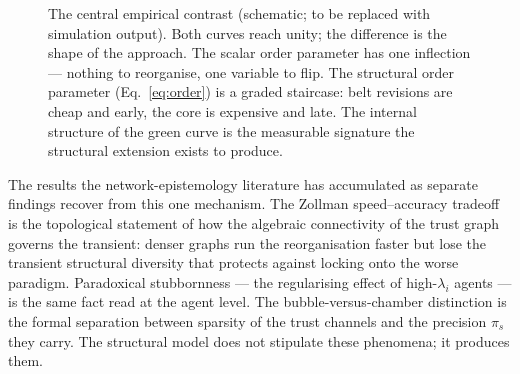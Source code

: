 \begin{figure}[t]
\centering
{}
\caption{The central empirical contrast (schematic; to be replaced with
simulation output). Both curves reach unity; the difference is the shape
of the approach. The scalar order parameter has one inflection ---
nothing to reorganise, one variable to flip. The structural order
parameter (Eq.~\ref{eq:order}) is a graded staircase: belt revisions are
cheap and early, the core is expensive and late. The internal structure
of the green curve is the measurable signature the structural extension
exists to produce.}
\label{fig:transition}
\end{figure}

The results the network-epistemology literature has accumulated as
separate findings recover from this one mechanism. The Zollman
speed--accuracy tradeoff%
is the topological statement of how the algebraic connectivity of the
trust graph governs the transient: denser graphs run the reorganisation
faster but lose the transient structural diversity that protects against
locking onto the worse paradigm. Paradoxical stubbornness --- the
regularising effect of high-$\lambda_i$ agents --- is the same fact read
at the agent level. The bubble-versus-chamber distinction
\citep{Nguyen2018_1} is the formal separation between sparsity of the
trust channels and the precision $\pi_s$ they carry. The structural model
does not stipulate these phenomena; it produces them.

